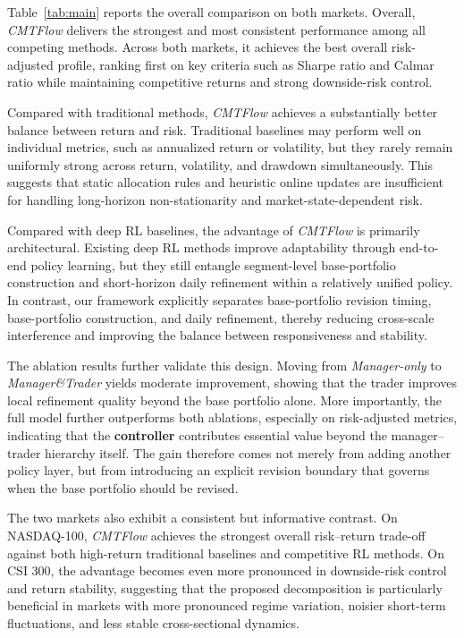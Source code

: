 \documentclass[letterpaper]{article} %
\begin{document}
Table~\ref{tab:main} reports the overall comparison on both markets. Overall, \textit{CMTFlow} delivers the strongest and most consistent performance among all competing methods. Across both markets, it achieves the best overall risk-adjusted profile, ranking first on key criteria such as Sharpe ratio and Calmar ratio while maintaining competitive returns and strong downside-risk control.

Compared with traditional methods, \textit{CMTFlow} achieves a substantially better balance between return and risk. Traditional baselines may perform well on individual metrics, such as annualized return or volatility, but they rarely remain uniformly strong across return, volatility, and drawdown simultaneously. This suggests that static allocation rules and heuristic online updates are insufficient for handling long-horizon non-stationarity and market-state-dependent risk.

Compared with deep RL baselines, the advantage of \textit{CMTFlow} is primarily architectural. Existing deep RL methods improve adaptability through end-to-end policy learning, but they still entangle segment-level base-portfolio construction and short-horizon daily refinement within a relatively unified policy. In contrast, our framework explicitly separates base-portfolio revision timing, base-portfolio construction, and daily refinement, thereby reducing cross-scale interference and improving the balance between responsiveness and stability.

The ablation results further validate this design. Moving from \textit{Manager-only} to \textit{Manager\&Trader} yields moderate improvement, showing that the trader improves local refinement quality beyond the base portfolio alone. More importantly, the full model further outperforms both ablations, especially on risk-adjusted metrics, indicating that the \textbf{controller} contributes essential value beyond the manager--trader hierarchy itself. The gain therefore comes not merely from adding another policy layer, but from introducing an explicit revision boundary that governs when the base portfolio should be revised.

The two markets also exhibit a consistent but informative contrast. On NASDAQ-100, \textit{CMTFlow} achieves the strongest overall risk--return trade-off against both high-return traditional baselines and competitive RL methods. On CSI 300, the advantage becomes even more pronounced in downside-risk control and return stability, suggesting that the proposed decomposition is particularly beneficial in markets with more pronounced regime variation, noisier short-term fluctuations, and less stable cross-sectional dynamics.
\end{document}

